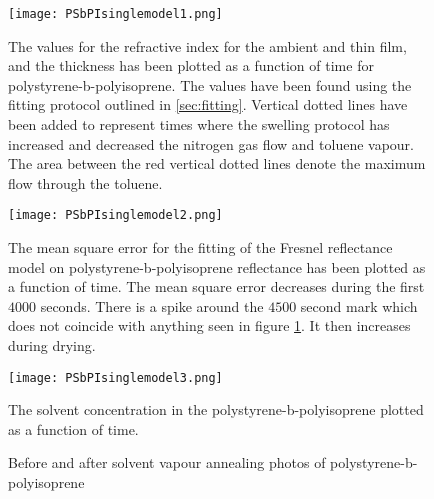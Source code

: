 \documentclass[MasterThesisMain.tex]{subfiles}
\begin{document}
\begin{figure}[H]
\centering
\texttt{[image: PSbPIsinglemodel1.png]}
\caption{The values for the refractive index for the ambient and thin film, and the thickness has been plotted as a function of time for polystyrene-b-polyisoprene. The values have been found using the fitting protocol outlined in \ref{sec:fitting}. Vertical dotted lines have been added to represent times where the swelling protocol has increased and decreased the nitrogen gas flow and toluene vapour. The area between the red vertical dotted lines denote the maximum flow through the toluene.}
\label{fig:PSbPIsinglemodel1}
\end{figure}

\begin{figure}[H]
\centering
\texttt{[image: PSbPIsinglemodel2.png]}
\caption{The mean square error for the fitting of the Fresnel reflectance model on polystyrene-b-polyisoprene reflectance has been plotted as a function of time. The mean square error decreases during the first $4000$ seconds. There is a spike around the $4500$ second mark which does not coincide with anything seen in figure \ref{fig:PSbPIsinglemodel1}. It then increases during drying.}
\label{fig:PSbPIsinglemodel2}
\end{figure}

\begin{figure}[H]
\centering
\texttt{[image: PSbPIsinglemodel3.png]}
\caption{The solvent concentration in the polystyrene-b-polyisoprene plotted as a function of time.}
\label{fig:PSbPIsinglemodel3}
\end{figure}

\begin{figure}
\centering     
{}
\caption{Before and after solvent vapour annealing photos of polystyrene-b-polyisoprene}
\end{figure}
\end{document}
